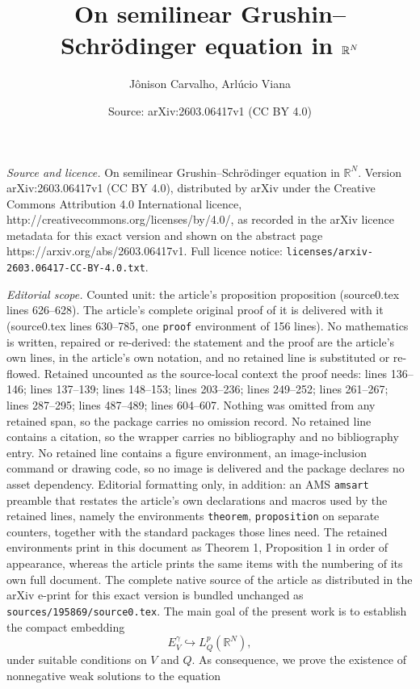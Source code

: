 \documentclass[10pt,a4paper]{amsart}
\title{On semilinear Grushin--Schrödinger equation in $\R^N$}
\author{J\^onison Carvalho, Arl\'ucio Viana}
\date{Source: arXiv:2603.06417v1 (CC BY 4.0)}
\newcommand{\R}{\mathbb{R}}
\begin{document}
\maketitle

\noindent\emph{Source and licence.} On semilinear Grushin--Schrödinger equation in $\R^N$. Version arXiv:2603.06417v1 (CC BY 4.0), distributed by arXiv under the Creative Commons Attribution 4.0 International licence, http://creativecommons.org/licenses/by/4.0/, as recorded in the arXiv licence metadata for this exact version and shown on the abstract page https://arxiv.org/abs/2603.06417v1. Full licence notice: \texttt{licenses/arxiv-2603.06417-CC-BY-4.0.txt}.\par\smallskip

\noindent\textit{Editorial scope.} Counted unit: the article's proposition proposition (source0.tex lines 626--628). The article's complete original proof of it is delivered with it (source0.tex lines 630--785, one \texttt{proof} environment of 156 lines). No mathematics is written, repaired or re-derived: the statement and the proof are the article's own lines, in the article's own notation, and no retained line is substituted or re-flowed.  Retained uncounted as the source-local context the proof needs: lines 136--146; lines 137--139; lines 148--153; lines 203--236; lines 249--252; lines 261--267; lines 287--295; lines 487--489; lines 604--607.  Nothing was omitted from any retained span, so the package carries no omission record.  No retained line contains a citation, so the wrapper carries no bibliography and no bibliography entry.  No retained line contains a figure environment, an image-inclusion command or drawing code, so no image is delivered and the package declares no asset dependency.  Editorial formatting only, in addition: an AMS \texttt{amsart} preamble that restates the article's own declarations and macros used by the retained lines, namely the environments \texttt{theorem}, \texttt{proposition} on separate counters, together with the standard packages those lines need.  The retained environments print in this document as Theorem 1, Proposition 1 in order of appearance, whereas the article prints the same items with the numbering of its own full document.  The complete native source of the article as distributed in the arXiv e-print for this exact version is bundled unchanged as \texttt{sources/195869/source0.tex}.
The main goal of the present work is to establish the compact embedding $$E_V^\gamma \hookrightarrow L^p_Q(\mathbb{R}^N) ,$$ under suitable conditions on $V$ and $Q$. As consequence, we prove the existence of nonnegative weak solutions to the equation
\end{document}
